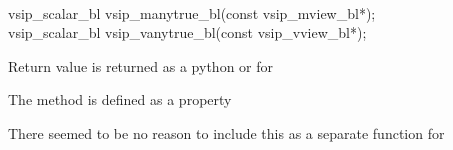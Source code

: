 \\\cvsiplh
\begin{cfuncs}
vsip\_scalar\_bl vsip\_manytrue\_bl(const vsip\_mview\_bl*);\Bs\\
vsip\_scalar\_bl vsip\_vanytrue\_bl(const vsip\_vview\_bl*);\Bs\\ 
\end{cfuncs}
\pyjvsiph
{}
\begin{comments}
\item{Return value  is returned as a python  or  for \pyjv}
\item{The  method is defined as a property}
\item{There seemed to be no reason to include this as a separate function for \pyjv}
\end{comments}